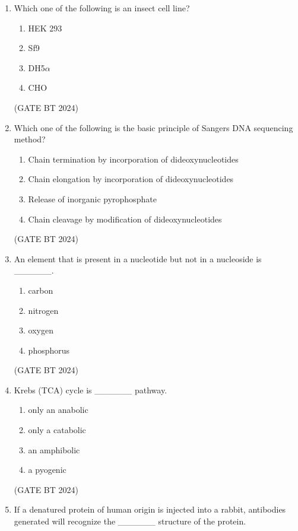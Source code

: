 \documentclass[journal,12pt,onecolumn]{IEEEtran}
\theoremstyle{remark}
\begin{document}
\begin{enumerate}
\item 
Which one of the following is an insect cell line?

\begin{enumerate}
    \item HEK 293
    \item Sf9
    \item DH5$\alpha$
    \item CHO
\end{enumerate}
\hfill(GATE BT 2024)

\item 
Which one of the following is the basic principle of Sangers DNA sequencing method?

\begin{enumerate}
    \item Chain termination by incorporation of dideoxynucleotides
    \item Chain elongation by incorporation of dideoxynucleotides
    \item Release of inorganic pyrophosphate
    \item Chain cleavage by modification of dideoxynucleotides
\end{enumerate}
\hfill(GATE BT 2024)

\item 
An element that is present in a nucleotide but not in a nucleoside is \_\_\_\_\_\_.

\begin{enumerate}
    \item carbon
    \item nitrogen
    \item oxygen
    \item phosphorus
\end{enumerate}
\hfill(GATE BT 2024)

\item 
Krebs (TCA) cycle is \_\_\_\_\_\_ pathway.

\begin{enumerate}
    \item only an anabolic
    \item only a catabolic
    \item an amphibolic
    \item a pyogenic
\end{enumerate}
\hfill(GATE BT 2024)

\item 
If a denatured protein of human origin is injected into a rabbit, antibodies generated will recognize the \_\_\_\_\_\_ structure of the protein.


\end{enumerate}
\end{document}
